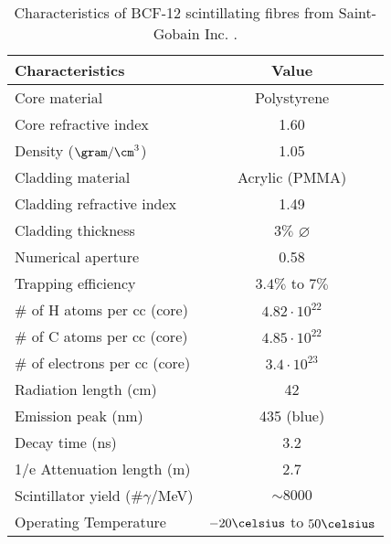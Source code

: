 \begin{table}[htbp]
\centering{}%
\begin{tabular}{lc}
\toprule 
Characteristics & Value \tabularnewline
\midrule
\midrule 
Core material & Polystyrene \tabularnewline
Core refractive index & 1.60 \tabularnewline
Density ($\gram/\cm^3$) & 1.05 \tabularnewline
Cladding material & Acrylic (PMMA) \tabularnewline
Cladding refractive index & 1.49 \tabularnewline
Cladding thickness & $3\%$  $\varnothing$ \tabularnewline
Numerical aperture & 0.58 \tabularnewline
Trapping efficiency & $3.4\%$ to $7\%$ \tabularnewline
$\#$ of H atoms per cc (core) & $4.82 \cdot{} 10^{22}$ \tabularnewline
$\#$ of C atoms per cc (core) & $4.85 \cdot{} 10^{22}$ \tabularnewline
$\#$ of electrons per cc (core) & $3.4 \cdot{} 10^{23}$ \tabularnewline
Radiation length (cm) & 42 \tabularnewline
Emission peak (nm) & 435 (blue) \tabularnewline
Decay time (ns) & 3.2 \tabularnewline
1/e Attenuation length (m) & 2.7 \tabularnewline
Scintillator yield (\#$\gamma$/MeV) & $\sim 8000$ \tabularnewline
Operating Temperature & $-20\celsius$ to $50\celsius$ \tabularnewline
\bottomrule
\end{tabular}
\caption{Characteristics of BCF-12 scintillating fibres from Saint-Gobain Inc. \cite{DataSheetBCF12Fiber}.}
\label{tab:ParametersFibersBCF12}
\end{table}